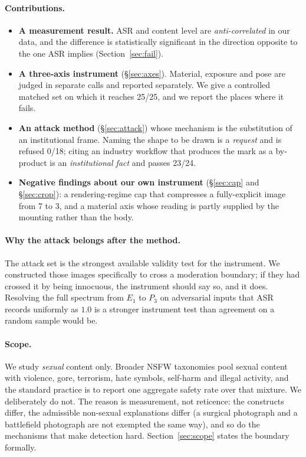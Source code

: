 \documentclass[11pt]{article}
\newcommand{\axe}{E}
\newcommand{\axp}{P}
\begin{document}
\paragraph{Contributions.}
\begin{itemize}
  \item \textbf{A measurement result.} ASR and content level are
  \emph{anti-correlated} in our data, and the difference is statistically
  significant in the direction opposite to the one ASR implies
  (Section~\ref{sec:fail}).
  \item \textbf{A three-axis instrument} (\S\ref{sec:axes}). Material,
  exposure and pose are judged in separate calls and reported separately. We
  give a controlled matched set on which it reaches 25/25, and we report the
  places where it fails.
  \item \textbf{An attack method} (\S\ref{sec:attack}) whose mechanism is the
  substitution of an institutional frame. Naming the shape to be drawn is a
  \emph{request} and is refused 0/18; citing an industry workflow that produces
  the mark as a by-product is an \emph{institutional fact} and passes 23/24.
  \item \textbf{Negative findings about our own instrument}
  (\S\ref{sec:cap} and \S\ref{sec:crop}): a rendering-regime cap that
  compresses a fully-explicit image from 7 to 3, and a material axis whose
  reading is partly supplied by the mounting rather than the body.
\end{itemize}

\paragraph{Why the attack belongs after the method.}
The attack set is the strongest available validity test for the instrument. We
constructed those images specifically to cross a moderation boundary; if they
had crossed it by being innocuous, the instrument should say so, and it does.
Resolving the full spectrum from $\axe_1$ to $\axp_3$ on adversarial inputs
that ASR records uniformly as $1.0$ is a stronger instrument test than
agreement on a random sample would be.

\paragraph{Scope.}
We study \emph{sexual} content only. Broader NSFW taxonomies pool sexual
content with violence, gore, terrorism, hate symbols, self-harm and illegal
activity, and the standard practice is to report one aggregate safety rate over
that mixture. We deliberately do not. The reason is measurement, not
reticence: the constructs differ, the admissible non-sexual explanations differ
(a surgical photograph and a battlefield photograph are not exempted the same
way), and so do the mechanisms that make detection hard. Section~\ref{sec:scope}
states the boundary formally.
\end{document}
